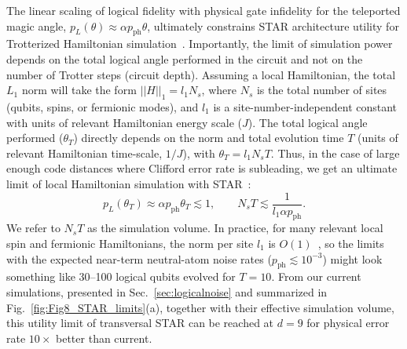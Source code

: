\documentclass[aps, prx, reprint, superscriptaddress, longbibliography, floatfix]{revtex4-2}
\begin{document}
 The linear scaling of logical fidelity with physical gate infidelity for the teleported magic angle, $p_L(\theta) \approx \alpha p_{\mathrm{ph}}\theta$, ultimately constrains STAR architecture utility for Trotterized Hamiltonian simulation~\cite{Akahoshi2024}. Importantly, the limit of simulation power depends on the total logical angle performed in the circuit and not on the number of Trotter steps (circuit depth). Assuming a local Hamiltonian, the total $L_1$ norm will take the form $\lvert\lvert H \rvert \rvert_1 =l_1 N_s $, where $N_s$ is the total number of sites (qubits, spins, or fermionic modes), and $l_1$ is a site-number-independent constant with units of relevant Hamiltonian energy scale ($J$). The total logical angle performed ($\theta_T$) directly depends on the norm and total evolution time $T$ (units of relevant Hamiltonian time-scale, $1/J$), with $\theta_T=l_1 N_s T$. Thus, in the case of large enough code distances where Clifford error rate is subleading, we get an ultimate limit of local Hamiltonian simulation with STAR~\cite{Toshio2024}:
\begin{equation}\label{eq:star_limit}
    p_L(\theta_T) \approx \alpha p_{\mathrm{ph}} \theta_T  \lesssim 1, \qquad
    N_s T  \lesssim \frac{1}{l_1 \alpha p_{\mathrm{ph}}}.
\end{equation}
We refer to $N_s T$ as the simulation volume. In practice, for many relevant local spin and fermionic Hamiltonians, the norm per site $l_1$ is $O(1)$~\cite{Campbell2021}, so the limits with the expected near-term neutral-atom noise rates ($p_{\mathrm{ph}} \lesssim 10^{-3}$) might look something like 30--100 logical qubits evolved for $T=10$. From our current simulations, presented in Sec.~\ref{sec:logicalnoise} and summarized in Fig.~\ref{fig:Fig8_STAR_limits}(a), together with their effective simulation volume, this utility limit of transversal STAR can be reached at $d=9$ for physical error rate $10 \times$ better than current.
\end{document}

